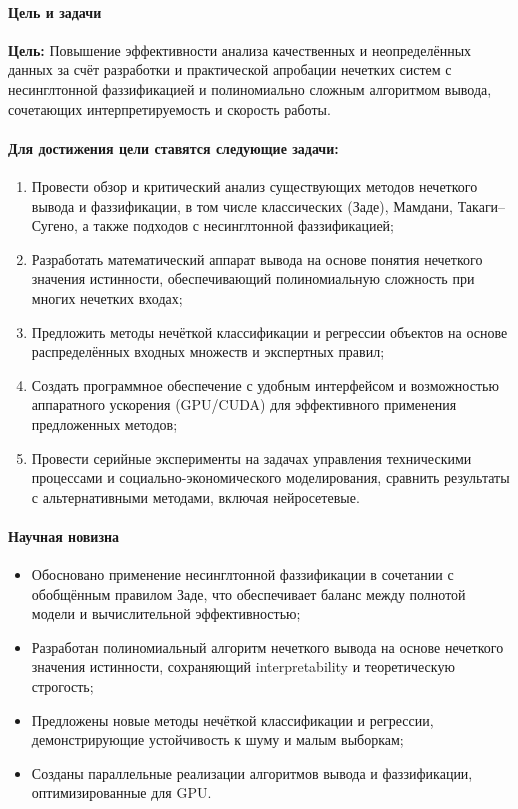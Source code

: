 \paragraph{Цель и задачи}

\textbf{Цель:} Повышение эффективности анализа качественных и неопределённых данных за счёт разработки и практической апробации нечетких систем с несинглтонной фаззификацией и полиномиально сложным алгоритмом вывода, сочетающих интерпретируемость и скорость работы.

\paragraph{Для достижения цели ставятся следующие задачи:}
\begin{enumerate}
  \item Провести обзор и критический анализ существующих методов нечеткого вывода и фаззификации, в том числе классических (Заде), Мамдани, Такаги–Сугено, а также подходов с несинглтонной фаззификацией;
  \item Разработать математический аппарат вывода на основе понятия нечеткого значения истинности, обеспечивающий полиномиальную сложность при многих нечетких входах;
  \item Предложить методы нечёткой классификации и регрессии объектов на основе распределённых входных множеств и экспертных правил;
  \item Создать программное обеспечение с удобным интерфейсом и возможностью аппаратного ускорения (GPU/CUDA) для эффективного применения предложенных методов;
  \item Провести серийные эксперименты на задачах управления техническими процессами и социально-экономического моделирования, сравнить результаты с альтернативными методами, включая нейросетевые.
\end{enumerate}

\paragraph{Научная новизна}

\begin{itemize}
  \item Обосновано применение несинглтонной фаззификации в сочетании с обобщённым правилом Заде, что обеспечивает баланс между полнотой модели и вычислительной эффективностью;
  \item Разработан полиномиальный алгоритм нечеткого вывода на основе нечеткого значения истинности, сохраняющий interpretability и теоретическую строгость;
  \item Предложены новые методы нечёткой классификации и регрессии, демонстрирующие устойчивость к шуму и малым выборкам;
  \item Созданы параллельные реализации алгоритмов вывода и фаззификации, оптимизированные для GPU.
\end{itemize}

